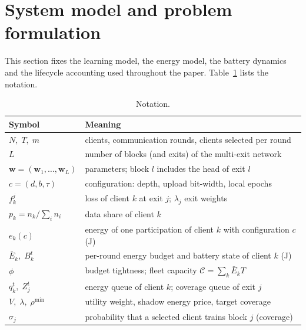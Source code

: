 \section{System model and problem formulation}\label{sec:model}

This section fixes the learning model, the energy model, the battery dynamics and the lifecycle accounting used throughout the paper. Table~\ref{tab:notation} lists the notation.

\begin{table}[t]
\centering\small
\caption{Notation.}\label{tab:notation}
\begin{tabular}{@{}ll@{}}
\toprule
Symbol & Meaning\\
\midrule
$N,\;T,\;m$ & clients, communication rounds, clients selected per round\\
$L$ & number of blocks (and exits) of the multi-exit network\\
$\mathbf w=(\mathbf w_1,\dots,\mathbf w_L)$ & parameters; block $l$ includes the head of exit $l$\\
$c=(d,b,\tau)$ & configuration: depth, upload bit-width, local epochs\\
$f_k^{j}$ & loss of client $k$ at exit $j$; $\lambda_j$ exit weights\\
$p_k=n_k/\sum_i n_i$ & data share of client $k$\\
$e_k(c)$ & energy of one participation of client $k$ with configuration $c$ (J)\\
$\bar E_k,\;B_k^t$ & per-round energy budget and battery state of client $k$ (J)\\
$\phi$ & budget tightness; fleet capacity $\mathcal C=\sum_k \bar E_k T$\\
$q_k^t,\;Z_j^t$ & energy queue of client $k$; coverage queue of exit $j$\\
$V,\;\lambda,\;\rho^{\min}$ & utility weight, shadow energy price, target coverage\\
$\sigma_j$ & probability that a selected client trains block $j$ (coverage)\\
\bottomrule
\end{tabular}
\end{table}

